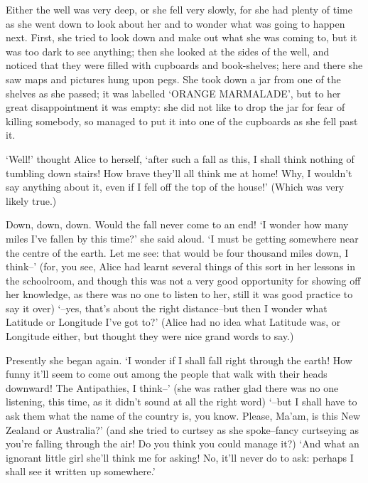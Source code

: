 \documentclass[statementpaper,twoside,openany]{memoir}
\begin{document}
Either the well was very deep, or she fell very slowly, for she had plenty of time as she went down to look about her and to wonder what was going to happen next. First, she tried to look down and make out what she was coming to, but it was too dark to see anything; then she looked at the sides of the well, and noticed that they were filled with cupboards and book-shelves; here and there she saw maps and pictures hung upon pegs. She took down a jar from one of the shelves as she passed; it was labelled `ORANGE MARMALADE', but to her great disappointment it was empty: she did not like to drop the jar for fear of killing somebody, so managed to put it into one of the cupboards as she fell past it.

`Well!' thought Alice to herself, `after such a fall as this, I shall think nothing of tumbling down stairs! How brave they'll all think me at home! Why, I wouldn't say anything about it, even if I fell off the top of the house!' (Which was very likely true.)

Down, down, down. Would the fall never come to an end! `I wonder how many miles I've fallen by this time?' she said aloud. `I must be getting somewhere near the centre of the earth. Let me see: that would be four thousand miles down, I think--' (for, you see, Alice had learnt several things of this sort in her lessons in the schoolroom, and though this was not a very good opportunity for showing off her knowledge, as there was no one to listen to her, still it was good practice to say it over) `--yes, that's about the right distance--but then I wonder what Latitude or Longitude I've got to?' (Alice had no idea what Latitude was, or Longitude either, but thought they were nice grand words to say.)

Presently she began again. `I wonder if I shall fall right through the earth! How funny it'll seem to come out among the people that walk with their heads downward! The Antipathies, I think--' (she was rather glad there was no one listening, this time, as it didn't sound at all the right word) `--but I shall have to ask them what the name of the country is, you know. Please, Ma'am, is this New Zealand or Australia?' (and she tried to curtsey as she spoke--fancy curtseying as you're falling through the air! Do you think you could manage it?) `And what an ignorant little girl she'll think me for asking! No, it'll never do to ask: perhaps I shall see it written up somewhere.'
\end{document}
